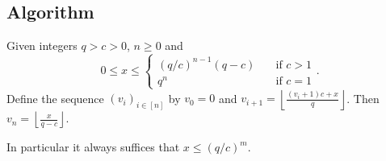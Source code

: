 
\subsection{Algorithm}

\begin{theorem}\label{thm:simple-div}
   Given integers $q>c>0$, $n\ge 0$ and
   $$0\le x \le \begin{cases}
      (q/c)^{n-1}(q-c) &\quad\text{if } c > 1\\
      q^{n} &\quad\text{if } c = 1
   \end{cases}.$$
   Define the sequence $(v_i)_{i\in[n]}$ by
   $
      v_0 = 0$ and
      $v_{i+1} = \left\lfloor\frac{(v_i+1)c+x}{q}\right\rfloor$.
   Then
   $
      v_n = \left\lfloor\frac{x}{q-c}\right\rfloor$.
\end{theorem}
In particular it always suffices that $x\le (q/c)^m$.

